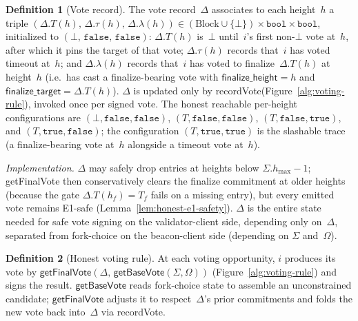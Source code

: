 \ifx\litemode\undefined\documentclass{article}\fi
\newcommand{\finalizeHeight}{\mathsf{finalize\_height}}
\newcommand{\finalizeTarget}{\mathsf{finalize\_target}}
\newcommand{\hmax}{\ensuremath{h_{\max}}\xspace}
\newcommand{\getBaseVote}{\textsf{getBaseVote}\xspace}
\newcommand{\getFinalVote}{\textsf{getFinalVote}\xspace}
\newcommand{\recordVote}{\textsf{recordVote}\xspace}
\theoremstyle{plain}
\theoremstyle{definition}
\newtheorem{definition}{Definition}
\theoremstyle{remark}
\begin{document}
\begin{definition}[Vote record]\label{def:voterecord}
The vote record~$\Delta$ associates to each height~$h$ a triple $(\Delta.T(h),\, \Delta.\tau(h),\, \Delta.\lambda(h)) \in (\mathrm{Block} \cup \{\bot\}) \times \mathtt{bool} \times \mathtt{bool}$, initialized to $(\bot,\, \mathtt{false},\, \mathtt{false})$:
$\Delta.T(h)$ is~$\bot$ until~$i$'s first non-$\bot$ vote at~$h$, after which it pins the target of that vote; $\Delta.\tau(h)$ records that~$i$ has voted timeout at~$h$; and $\Delta.\lambda(h)$ records that~$i$ has voted to finalize~$\Delta.T(h)$ at height~$h$ (i.e.\ has cast a finalize-bearing vote with $\finalizeHeight = h$ and $\finalizeTarget = \Delta.T(h)$).
$\Delta$ is updated only by \recordVote (Figure~\ref{alg:voting-rule}), invoked once per signed vote.
The honest reachable per-height configurations are $(\bot, \mathtt{false}, \mathtt{false})$, $(T, \mathtt{false}, \mathtt{false})$, $(T, \mathtt{false}, \mathtt{true})$, and $(T, \mathtt{true}, \mathtt{false})$; the configuration $(T, \mathtt{true}, \mathtt{true})$ is the slashable trace (a finalize-bearing vote at~$h$ alongside a timeout vote at~$h$).

\smallskip
\noindent\emph{Implementation.}
$\Delta$ may safely drop entries at heights below $\Sigma.\hmax - 1$; \getFinalVote then conservatively clears the finalize commitment at older heights (because the gate $\Delta.T(h_f) = T_f$ fails on a missing entry), but every emitted vote remains E1-safe (Lemma~\ref{lem:honest-e1-safety}).
$\Delta$ is the entire state needed for safe vote signing on the validator-client side, depending only on~$\Delta$, separated from fork-choice on the beacon-client side (depending on $\Sigma$ and~$\Omega$).
\end{definition}

\begin{definition}[Honest voting rule]\label{def:voting-rule}
At each voting opportunity, $i$ produces its vote by $\getFinalVote(\Delta,\, \getBaseVote(\Sigma, \Omega))$ (Figure~\ref{alg:voting-rule}) and signs the result.
$\getBaseVote$ reads fork-choice state to assemble an unconstrained candidate; $\getFinalVote$ adjusts it to respect~$\Delta$'s prior commitments and folds the new vote back into~$\Delta$ via \recordVote.
\end{definition}
\end{document}
